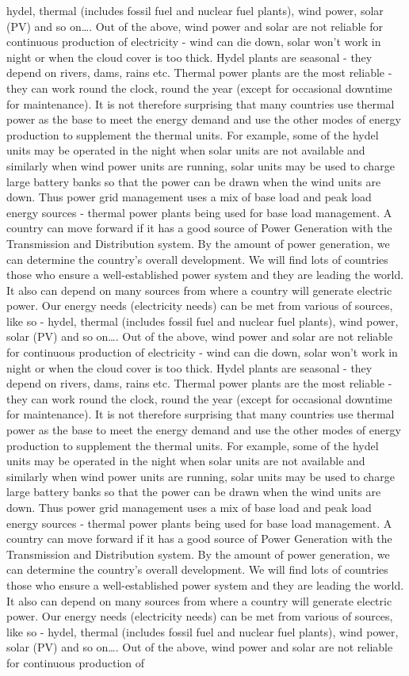 \documentclass[10pt, a4paper]{article}
\begin{document}
hydel, thermal (includes fossil fuel and nuclear fuel plants), wind power, solar (PV) and so on\dots. Out of the above, wind power and solar are not reliable for continuous production of electricity - wind can die down, solar won’t work in night or when the cloud cover is too thick. Hydel plants are seasonal - they depend on rivers, dams, rains etc. Thermal power plants are the most reliable - they can work round the clock, round the year (except for occasional downtime for maintenance). It is not therefore surprising that many countries use thermal power as the base to meet the energy demand and use the other modes of energy production to supplement the thermal units. For example, some of the hydel units may be operated in the night when solar units are not available and similarly when wind power units are running, solar units may be used to charge large battery banks so that the power can be drawn when the wind units are down. Thus power grid management uses a mix of base load and peak load energy sources - thermal power plants being used for base load management. A country can move forward if it has a good source of Power Generation with the Transmission and Distribution system. By the amount of power generation, we can determine the country’s overall development. We will find lots of countries those who ensure a well-established power system and they are leading the world. It also can depend on many sources from where a country will generate electric power. Our energy needs (electricity needs) can be met from various of sources, like so - hydel, thermal (includes fossil fuel and nuclear fuel plants), wind power, solar (PV) and so on\dots. Out of the above, wind power and solar are not reliable for continuous production of electricity - wind can die down, solar won’t work in night or when the cloud cover is too thick. Hydel plants are seasonal - they depend on rivers, dams, rains etc. Thermal power plants are the most reliable - they can work round the clock, round the year (except for occasional downtime for maintenance). It is not therefore surprising that many countries use thermal power as the base to meet the energy demand and use the other modes of energy production to supplement the thermal units. For example, some of the hydel units may be operated in the night when solar units are not available and similarly when wind power units are running, solar units may be used to charge large battery banks so that the power can be drawn when the wind units are down. Thus power grid management uses a mix of base load and peak load energy sources - thermal power plants being used for base load management. A country can move forward if it has a good source of Power Generation with the Transmission and Distribution system. By the amount of power generation, we can determine the country’s overall development. We will find lots of countries those who ensure a well-established power system and they are leading the world. It also can depend on many sources from where a country will generate electric power. Our energy needs (electricity needs) can be met from various of sources, like so - hydel, thermal (includes fossil fuel and nuclear fuel plants), wind power, solar (PV) and so on\dots. Out of the above, wind power and solar are not reliable for continuous production of 
\end{document}
